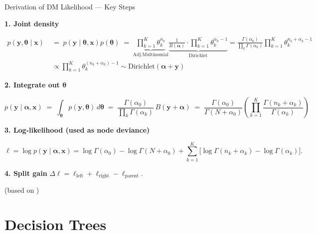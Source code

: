 \documentclass[aspectratio=169,professionalfonts]{beamer}
\begin{document}
\begin{frame}{Derivation of DM Likelihood — Key Steps}
\scriptsize
\setlength{\abovedisplayskip}{4pt}
\setlength{\belowdisplayskip}{4pt}

\textbf{1.  Joint density}\par
\begin{align*}
    p(\mathbf y,\boldsymbol\theta \mid \mathbf x) 
    \;&=\; 
    p(\mathbf{y} \mid \boldsymbol{\theta}, \mathbf{x}) p(\boldsymbol{\theta})
    \;=\; \underbrace{\prod_{k=1}^K\theta_k^{n_k}}_{\mathrm{Adj.Multinomial}} 
    \underbrace{\frac{1}{B(\boldsymbol\alpha)} \cdot
    \prod_{k=1}^K\theta_k^{\alpha_k-1}}_{\mathrm{Dirichlet}}
    = \frac{\Gamma(\alpha_0)}{\prod_k\Gamma(\alpha_k)}
      \prod_{k=1}^K\theta_k^{n_k+\alpha_k-1}\\
    &\propto \prod_{k=1}^K \theta_k^{(n_k+\alpha_k)-1} \sim \mathrm{Dirichlet}(\boldsymbol\alpha + \mathbf{y})
\end{align*}


\textbf{2.  Integrate out $\boldsymbol\theta$}\par
\[
    p(\mathbf y\mid\boldsymbol\alpha, \mathbf{x})
    \;=\; 
    \int_{\boldsymbol{\theta}} p(\mathbf y,\boldsymbol\theta)\,d\boldsymbol\theta
    \;=\; 
    \frac{\Gamma(\alpha_0)}{\prod_k\Gamma(\alpha_k)}
        \,B(\mathbf y+\boldsymbol\alpha)
    \;=\; 
    \frac{\Gamma(\alpha_0)} {\Gamma(N+\alpha_0)}
    \left( \prod_{k=1}^K\frac{\Gamma(n_k+\alpha_k)}{\Gamma(\alpha_k)} \right)
\]

\textbf{3.  Log-likelihood (used as node deviance)}\par
\[
\ell = \log p(\mathbf{y} \mid \boldsymbol{\alpha},\mathbf{x}) =\log\Gamma(\alpha_0)-\log\Gamma(N+\alpha_0) + \sum_{k=1}^K\bigl[\log\Gamma(n_k+\alpha_k)-\log\Gamma(\alpha_k)\bigr].
\]

\textbf{4.  Split gain}\quad
$\displaystyle\Delta\ell=\ell_{\text{left}}+\ell_{\text{right}}-\ell_{\text{parent}}$.\par
\medskip
\tiny
(based on \citealp{mimno_polya,gundersen2020dirichlet-multinomial,minka2000estimating})
\end{frame}

\section{Decision Trees}
\end{document}
